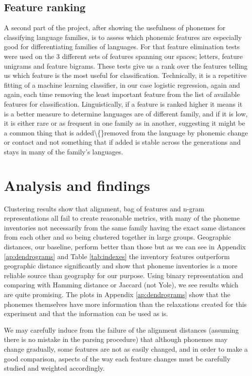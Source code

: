 \documentclass[letterpaper, 11pt]{article}
\begin{document}
\subsection*{Feature ranking}
A second part of the project, after showing the usefulness of phonemes for classifying language families, is to assess which phonemic features are especially good for differentiating families of languages. For that feature elimination tests were used on the 3 different sets of features spanning our spaces; letters, feature unigrams and feature bigrams. These tests give us a rank over the features telling us which feature is the most useful for  classification. 
Technically, it is a repetitive fitting of a machine learning classifier, in our case logistic regression, again and again, each time removing the least important feature from the list of available features for classification. 
Linguistically, if a feature is ranked higher it means it is a better measure to determine languages are of different family, and if it is low, it is either rare or as frequent in one family as in another, suggesting it might be a common thing that is added\textbackslash\{\}removed from the language by phonemic change or contact and not something that if added is stable across the generations and stays in many of the family’s languages.

\section{Analysis and findings}
Clustering results show that alignment, bag of features and n-gram representations all fail to create reasonable metrics, with many of the phoneme inventories not necessarily from the same family having the exact same distances from each other and so being clustered together in large groups. Geographic distances, our baseline, perform better than those but as we can see in Appendix \ref{ap:dendrograms} and Table \ref{tab:indexes} the inventory features outperform geographic distance significantly and show that phoneme inventories is a more reliable source than geography for our purpose. Using binary representation and comparing with Hamming distance or Jaccard (not Yole), we see results which are quite promising. The plots in Appendix \ref{ap:dendrograms} show that the phonemes themselves have more information than the relaxations created for this experiment and that the information can be used as is.

We may carefully induce from the failure of the alignment distances (assuming there is no mistake in the parsing procedure) that although phonemes may change gradually, some features are not as easily changed, and in order to make a good comparison, aspects of the way each feature changes must be carefully studied and weighted accordingly.
\end{document}
